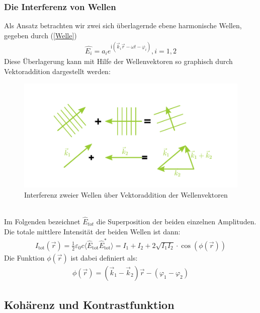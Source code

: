 \documentclass[german,  %
parskip=full,  %
]{scrartcl}
\begin{document}
\subsubsection{Die Interferenz von Wellen}
Als Ansatz betrachten wir zwei sich überlagernde ebene harmonische Wellen, gegeben durch (\ref{Welle})
\begin{align}
\label{Welle} \hat{E_i}=a_i e^{\mathrm{i}(\vec{k}_i \vec{r} - \omega t - \varphi_i)}, i=1,2
\end{align}
Diese Überlagerung kann mit Hilfe der Wellenvektoren so graphisch durch Vektoraddition dargestellt werden:
\\
\begin{figure}[h!]\centering
\includegraphics[scale=0.4]{interferenz.png}
\caption{Interferenz zweier Wellen über Vektoraddition der Wellenvektoren}
\end{figure}
\\
Im Folgenden bezeichnet $\hat{E}_{tot}$ die Superposition der beiden einzelnen Amplituden.
Die totale mittlere Intensität der beiden Wellen ist dann:
\begin{align}
\label{Intensität4} I_{\mathrm{tot}}(\vec{r})=\frac{1}{2} \varepsilon_0 c \langle \hat{E}_{\mathrm{tot}} \hat{E}_{\mathrm{tot}}^* \rangle = 
I_1 + I_2 + 2\sqrt{I_1 I_2}\cdot \cos(\phi(\vec{r}))
\end{align}
Die Funktion $\phi(\vec{r})$ ist dabei definiert als:
\begin{align}
 \phi(\vec{r}) = (\vec{k}_1 - \vec{k}_2) \vec{r} - (\varphi_1 - \varphi_2)
\end{align}

\subsection{Kohärenz und Kontrastfunktion}
\end{document}
